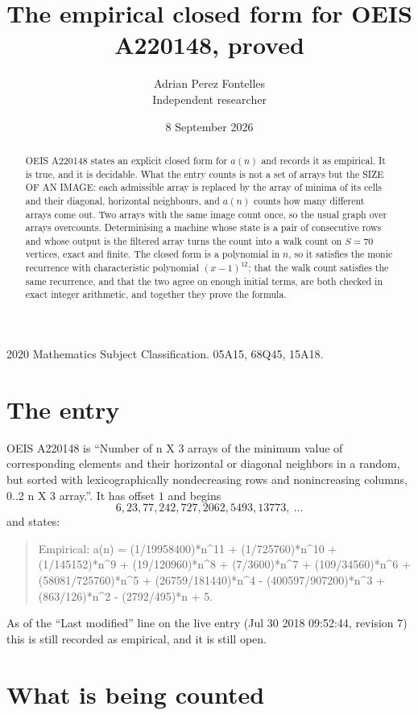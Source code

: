 \documentclass[11pt,a4paper]{article}
\title{The empirical closed form for OEIS A220148, proved}
\author{Adrian Perez Fontelles\\ \small Independent researcher}
\date{8 September 2026}
\theoremstyle{plain}
\theoremstyle{definition}
\begin{document}
\maketitle

\begin{abstract}
OEIS A220148 states an explicit closed form for $a(n)$ and records it as empirical. It is true, and
it is decidable. What the entry counts is not a set of arrays but the SIZE OF AN IMAGE: each
admissible array is replaced by the array of minima of its cells and their diagonal, horizontal neighbours,
and $a(n)$ counts how many different arrays come out. Two arrays with the same image count
once, so the usual graph over arrays overcounts. Determinising a machine whose state is a pair
of consecutive rows and whose output is the filtered array turns the count into a walk count on
$S=70$ vertices, exact and finite. The closed form is a polynomial in $n$, so it satisfies the
monic recurrence with characteristic polynomial $(x-1)^{12}$; that the walk count
satisfies the same recurrence, and that the two agree on enough initial terms, are both checked
in exact integer arithmetic, and together they prove the formula.
\end{abstract}

\noindent\small 2020 Mathematics Subject Classification. 05A15, 68Q45, 15A18.\normalsize

\section{The entry}

OEIS A220148 is ``Number of n X 3 arrays of the minimum value of corresponding elements and their horizontal or diagonal neighbors in a random, but sorted with lexicographically nondecreasing rows and nonincreasing columns, 0..2 n X 3 array.''. It has offset $1$ and begins
\[
6, 23, 77, 242, 727, 2062, 5493, 13773,\ \dots
\]
and states:
\begin{quote}
Empirical: a(n) = (1/19958400)*n\^{}11 + (1/725760)*n\^{}10 + (1/145152)*n\^{}9 + (19/120960)*n\^{}8 + (7/3600)*n\^{}7 + (109/34560)*n\^{}6 + (58081/725760)*n\^{}5 + (26759/181440)*n\^{}4 - (400597/907200)*n\^{}3 + (863/126)*n\^{}2 - (2792/495)*n + 5.
\end{quote}
As of the ``Last modified'' line on the live entry (Jul 30 2018 09:52:44, revision 7)
this is still recorded as empirical, and it is still open.

\section{What is being counted}
\end{document}
